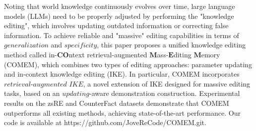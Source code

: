Noting that world knowledge continuously evolves over time, large language models (LLMs) need to be properly adjusted by performing the "knowledge editing", which involves updating outdated information or correcting false information. To achieve  reliable and "massive" editing capabilities in terms of $\textit{generalization}$ and $\textit{specificity}$, this paper proposes a unified knowledge editing method called in-$\textbf{CO}$ntext retrieval-augmented $\textbf{M}$ass-$\textbf{E}$diting $\textbf{M}$emory (COMEM), which combines two types of editing approaches: parameter updating and in-context knowledge editing (IKE). In particular, COMEM incorporates $\textit{retrieval-augmented IKE}$, a novel extension of IKE designed for  massive editing tasks, based on an $\textit{updating}$-aware demonstration construction. Experimental results on the zsRE and CounterFact datasets demonstrate that COMEM outperforms all existing methods, achieving state-of-the-art performance. Our code is available at https://github.com/JoveReCode/COMEM.git.